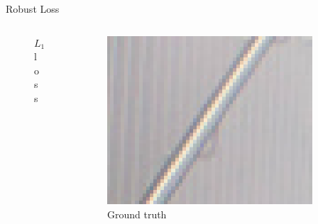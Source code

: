 \documentclass{beamer}
\begin{document}
\begin{frame}{Robust Loss}
\begin{columns}
\begin{column}{0.33\linewidth}
\begin{figure}[h]
      \caption*{$L_1$ loss}
    \end{figure}
  \end{column}  \begin{column}{0.33\linewidth}
    \begin{figure}[h]
      \centering
        \includegraphics[width=0.9\textwidth]{loss_functions_lap_gt}
      \caption*{Ground truth}
    \end{figure}
  \end{column}
\end{columns}
\end{frame}
\end{document}
